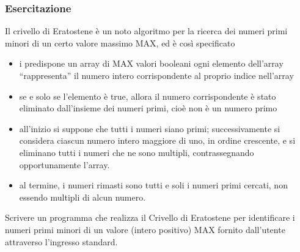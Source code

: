 \begin{frame}
\frametitle{Esercitazione}
\begin{block}{}
Il crivello di Eratostene è un noto algoritmo per la ricerca dei numeri primi minori di un certo valore massimo MAX, ed è così 
specificato
\begin{itemize}
\item i predispone un array di MAX valori booleani ogni elemento dell'array ``rappresenta'' il numero intero corrispondente al 
proprio indice nell'array
\item se e solo se l'elemento è true, allora il numero corrispondente è stato eliminato dall'insieme dei numeri primi, cioè non è un 
numero primo
\item all'inizio si suppone che tutti i numeri siano primi; successivamente si considera ciascun numero intero maggiore di uno,
in ordine crescente, e si eliminano tutti i numeri che ne sono multipli, contrassegnando opportunamente l'array.
\item al termine, i numeri rimasti sono tutti e soli i numeri primi cercati, non essendo multipli di alcun numero.
\end{itemize}
\end{block}
\end{frame}

\begin{frame}

\begin{block}{}
Scrivere un programma che realizza il Crivello di Eratostene per identificare i numeri primi minori di un valore (intero positivo)
MAX fornito dall'utente attraverso l'ingresso standard.
\end{block}
\end{frame}
